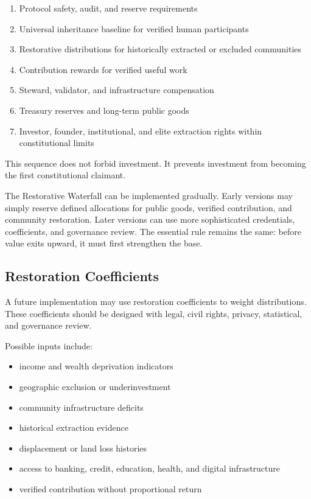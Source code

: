 \documentclass[12pt]{article}
\begin{document}
\begin{enumerate}
  \item Protocol safety, audit, and reserve requirements
  \item Universal inheritance baseline for verified human participants
  \item Restorative distributions for historically extracted or excluded communities
  \item Contribution rewards for verified useful work
  \item Steward, validator, and infrastructure compensation
  \item Treasury reserves and long-term public goods
  \item Investor, founder, institutional, and elite extraction rights within constitutional limits
\end{enumerate}

This sequence does not forbid investment. It prevents investment from becoming the first constitutional claimant.

The Restorative Waterfall can be implemented gradually. Early versions may simply reserve defined allocations for public goods, verified contribution, and community restoration. Later versions can use more sophisticated credentials, coefficients, and governance review. The essential rule remains the same: before value exits upward, it must first strengthen the base.

\subsection{Restoration Coefficients}

A future implementation may use restoration coefficients to weight distributions. These coefficients should be designed with legal, civil rights, privacy, statistical, and governance review.

Possible inputs include:

\begin{itemize}
  \item income and wealth deprivation indicators
  \item geographic exclusion or underinvestment
  \item community infrastructure deficits
  \item historical extraction evidence
  \item displacement or land loss histories
  \item access to banking, credit, education, health, and digital infrastructure
  \item verified contribution without proportional return
\end{itemize}
\end{document}

